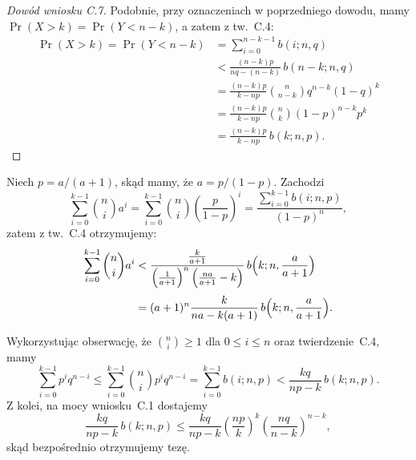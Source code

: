 \begin{proof}[Dowód wniosku C.7]
	Podobnie, przy oznaczeniach w poprzedniego dowodu, mamy $\Pr(X>k)=\Pr(Y<n-k)$, a zatem z tw.~C.4:
	\begin{align*}
		\Pr(X>k) = \Pr(Y<n-k) &= \sum_{i=0}^{n-k-1}b(i;n,q) \\
		&< \frac{(n-k)p}{nq-(n-k)}\,b(n-k;n,q) \\[1mm]
		&= \frac{(n-k)p}{k-np}\binom{n}{n-k}q^{n-k}(1-q)^k \\[1mm]
		&= \frac{(n-k)p}{k-np}\binom{n}{k}(1-p)^{n-k}p^k \\[1mm]
		&= \frac{(n-k)p}{k-np}\,b(k;n,p).
	\end{align*}
\end{proof}

\exercise{} %
\noindent Niech $p=a/(a+1)$, skąd mamy, że $a=p/(1-p)$. Zachodzi
\[
	\sum_{i=0}^{k-1}\binom{n}{i}a^i = \sum_{i=0}^{k-1}\binom{n}{i}\left(\frac{p}{1-p}\right)^i = \frac{\sum_{i=0}^{k-1}b(i;n,p)}{(1-p)^n},
\]
zatem z tw.~C.4 otrzymujemy:
\begin{align*}
	\sum_{i=0}^{k-1}\binom{n}{i}a^i &< \frac{\frac{k}{a+1}}{\left(\frac{1}{a+1}\right)^n\left(\frac{na}{a+1}-k\right)}\,b\Bigl(k;n,\frac{a}{a+1}\Bigr) \\[1mm]
	&= (a+1)^n\frac{k}{na-k(a+1)}\,b\Bigl(k;n,\frac{a}{a+1}\Bigr).
\end{align*}

\exercise{} %
\noindent Wykorzystując obserwację, że $\binom{n}{i}\ge1$ dla $0\le i\le n$ oraz twierdzenie~C.4, mamy
\[
	\sum_{i=0}^{k-1}p^iq^{n-i} \le \sum_{i=0}^{k-1}\binom{n}{i}p^iq^{n-i} = \sum_{i=0}^{k-1}b(i;n,p) < \frac{kq}{np-k}\,b(k;n,p).
\]
Z kolei, na mocy wniosku~C.1 dostajemy
\[
	\frac{kq}{np-k}\,b(k;n,p) \le \frac{kq}{np-k}\left(\frac{np}{k}\right)^k\left(\frac{nq}{n-k}\right)^{n-k},
\]
skąd bezpośrednio otrzymujemy tezę.

